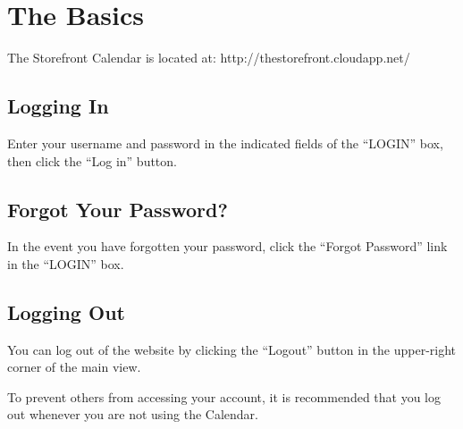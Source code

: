 \section{The Basics}

The Storefront Calendar is located at: http://thestorefront.cloudapp.net/


\subsection{Logging In}

Enter your username and password in the indicated fields of the ``LOGIN'' box, then click the ``Log in'' button.



\subsection{Forgot Your Password?}

In the event you have forgotten your password, click the ``Forgot Password'' link in the ``LOGIN'' box.



\subsection{Logging Out}

You can log out of the website by clicking the ``Logout'' button in the upper-right corner of the main view.

To prevent others from accessing your account, it is recommended that you log out whenever you are not using the Calendar.



